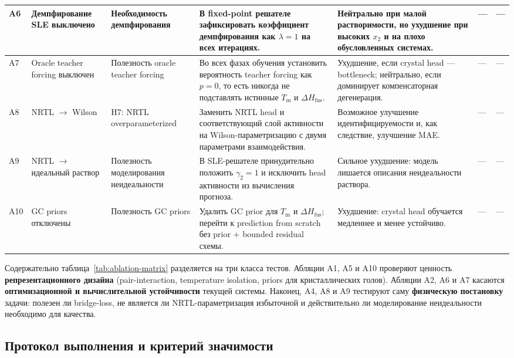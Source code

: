\documentclass[11pt]{article}
\begin{document}
\begin{landscape}
\begin{longtable}{|C{0.9cm}|P{2.8cm}|P{2.7cm}|P{3.8cm}|P{8.0cm}|C{1.2cm}|C{1.4cm}|}
\hline
A6 & Демпфирование SLE выключено & Необходимость демпфирования & В fixed-point решателе зафиксировать коэффициент демпфирования как $\lambda=1$ на всех итерациях. & Нейтрально при малой растворимости, но ухудшение при высоких $x_2$ и на плохо обусловленных системах. & --- & --- \\
\hline
A7 & Oracle teacher forcing выключен & Полезность oracle teacher forcing & Во всех фазах обучения установить вероятность teacher forcing как $p=0$, то есть никогда не подставлять истинные $T_{\mathrm{m}}$ и $\Delta H_{\mathrm{fus}}$. & Ухудшение, если crystal head --- bottleneck; нейтрально, если доминирует компенсаторная дегенерация. & --- & --- \\
\hline
A8 & NRTL $\to$ Wilson & H7: NRTL overparameterized & Заменить NRTL head и соответствующий слой активности на Wilson-параметризацию с двумя параметрами взаимодействия. & Возможное улучшение идентифицируемости и, как следствие, улучшение MAE. & --- & --- \\
\hline
A9 & NRTL $\to$ идеальный раствор & Полезность моделирования неидеальности & В SLE-решателе принудительно положить $\gamma_2=1$ и исключить head активности из вычисления прогноза. & Сильное ухудшение: модель лишается описания неидеальности раствора. & --- & --- \\
\hline
A10 & GC priors отключены & Полезность GC priors & Удалить GC prior для $T_{\mathrm{m}}$ и $\Delta H_{\mathrm{fus}}$; перейти к prediction from scratch без prior + bounded residual схемы. & Ухудшение: crystal head обучается медленнее и менее устойчиво. & --- & --- \\
\end{longtable}
\normalsize
\end{landscape}

Содержательно таблица~\ref{tab:ablation-matrix} разделяется на три класса тестов. Абляции A1, A5 и A10 проверяют ценность \textbf{репрезентационного дизайна} (pair-interaction, temperature isolation, priors для кристаллических голов). Абляции A2, A6 и A7 касаются \textbf{оптимизационной и вычислительной устойчивости} текущей системы. Наконец, A4, A8 и A9 тестируют саму \textbf{физическую постановку} задачи: полезен ли bridge-loss, не является ли NRTL-параметризация избыточной и действительно ли моделирование неидеальности необходимо для качества.

\subsection{Протокол выполнения и критерий значимости}
\end{document}
